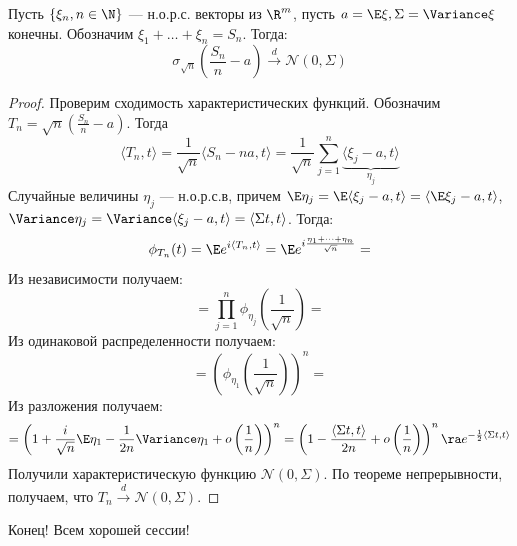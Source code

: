 \begin{theorem}
    Пусть \(\{\xi_n, n \in \N\}\) --- н.о.р.с. векторы из \(\R^m\), пусть \(a = \E\xi, \Sigma = \Variance \xi\) конечны. Обозначим \(\xi_1 + \dots + \xi_n = S_n\). Тогда:
    \[\sigma_{\sqrt{n}}\left( \frac{S_n}{n} - a \right) \xrightarrow{d} \mathcal{N}(0, \Sigma)\]
\end{theorem}
\begin{proof}
    Проверим сходимость характеристических функций. Обозначим \(T_n = \sqrt{n}\left( \frac{S_n}{n} - a \right)\). Тогда
    \[\langle T_n, t \rangle = \frac{1}{\sqrt{n}}\langle S_n - na, t \rangle = \frac{1}{\sqrt{n}}\sum_{j = 1}^n\underbrace{\langle \xi_j - a, t \rangle}_{\eta_j}\]
    Случайные величины \(\eta_j\) --- н.о.р.с.в, причем \(\E\eta_j = \E\langle \xi_j - a, t\rangle = \langle \E\xi_j - a, t\rangle\), \(\Variance\eta_j = \Variance\langle \xi_j - a, t\rangle = \langle \Sigma t, t\rangle\). Тогда:
    \[\phi_{T_n}(t) = \E e^{i\langle T_n, t \rangle} = \E e^{i \frac{\eta_1 + \dots + \eta_n}{\sqrt{n}}} =\]
    Из независимости получаем:
    \[= \prod_{j = 1}^n \phi_{\eta_j}\left( \frac{1}{\sqrt{n}} \right) = \]
    Из одинаковой распределенности получаем:
    \[= \left( \phi_{\eta_1}\left( \frac{1}{\sqrt{n}} \right) \right)^n = \]
    Из разложения получаем:
    \[= \left(1 + \frac{i}{\sqrt{n}}\E\eta_1 - \frac{1}{2n}\Variance \eta_1 + o\left( \frac{1}{n} \right)\right)^n = \left( 1 - \frac{\langle \Sigma t, t \rangle}{2n} + o\left( \frac{1}{n} \right) \right)^n \ra e^{-\frac{1}{2}\langle \Sigma t, t \rangle}\]
    Получили характеристическую функцию \(\mathcal{N}(0, \Sigma)\). По теореме непрерывности, получаем, что \(T_n \xrightarrow{d} \mathcal{N}(0, \Sigma)\).
\end{proof}

Конец! Всем хорошей сессии!
